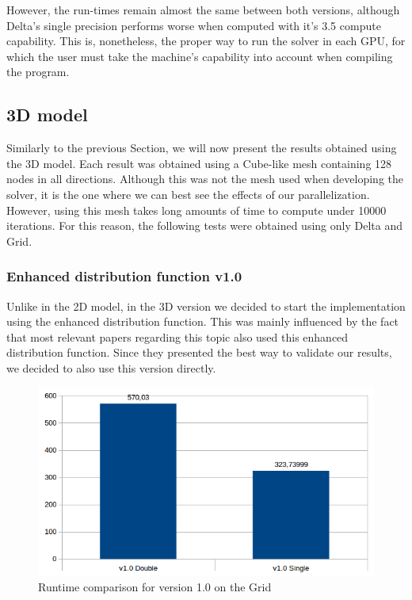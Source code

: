 \documentclass[12pt, openany]{book}
\begin{document}
  However, the run-times remain almost the same between both versions, although Delta's single precision performs worse when computed with it's 3.5 compute capability. This is, nonetheless, the proper way to run the solver in each GPU, for which the user must take the machine's capability into account when compiling the program.
 
\subsection{3D model}
Similarly to the previous Section, we will now present the results obtained using the 3D model. Each result was obtained using a Cube-like mesh containing 128 nodes in all directions. Although this was not the mesh used when developing the solver, it is the one where we can best see the effects of our parallelization. However, using this mesh takes long amounts of time to compute under 10000 iterations. For this reason, the following tests were obtained using only Delta and Grid. 
\subsubsection{Enhanced distribution function v1.0}
Unlike in the 2D model, in the 3D version we decided to start the implementation using the enhanced distribution function. This was mainly influenced by the fact that most relevant papers regarding this topic also used this enhanced distribution function. Since they presented the best way to validate our results, we decided to also use this version directly.

  \begin{figure}[H]
  	\centering
  	\includegraphics[width=\linewidth]{Resources/Images/v13d.png}
  	\caption{Runtime comparison for version 1.0 on the Grid}
  	\label{fig:v13d}
  \end{figure}
 
\end{document}
